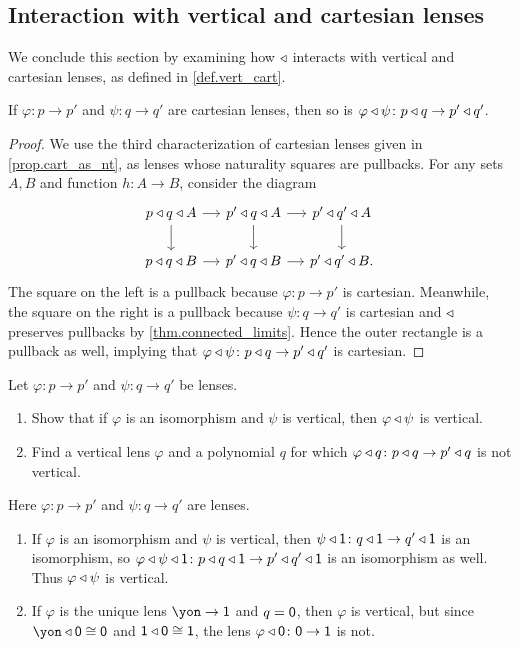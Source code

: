 \documentclass[Book-Poly]{subfiles}
\begin{document}
\subsection{Interaction with vertical and cartesian lenses} \label{subsec.comon.comp.prop.cart}

We conclude this section by examining how $\mathbin{\triangleleft}$ interacts with vertical and cartesian lenses, as defined in \cref{def.vert_cart}.

\begin{proposition}\label{prop.comp_pres_cart}
If $\varphi\colon p\to p'$ and $\psi\colon q\to q'$ are cartesian lenses, then so is $\varphi\mathbin{\triangleleft} \psi\colon p\mathbin{\triangleleft} q \to p'\mathbin{\triangleleft} q'$.
\end{proposition}
\begin{proof}
We use the third characterization of cartesian lenses given in \cref{prop.cart_as_nt}, as lenses whose naturality squares are pullbacks.
For any sets $A,B$ and function $h\colon A\to B$, consider the diagram
\[
\begin{tikzcd}[column sep=small]
    p\tri q\tri A\ar[r]\ar[d] & p'\tri q\tri A\ar[r]\ar[d] & p'\tri q'\tri A\ar[d] \\
    p\tri q\tri B\ar[r] & p'\tri q\tri B\ar[r] & p'\tri q'\tri B.
\end{tikzcd}
\]
The square on the left is a pullback because $\varphi\colon p\to p'$ is cartesian.
Meanwhile, the square on the right is a pullback because $\psi\colon q\to q'$ is cartesian and $\mathbin{\triangleleft}$ preserves pullbacks by \cref{thm.connected_limits}.
Hence the outer rectangle is a pullback as well, implying that $\varphi\mathbin{\triangleleft} \psi\colon p\mathbin{\triangleleft} q \to p'\mathbin{\triangleleft} q'$ is cartesian.
\end{proof}

\begin{exercise}
Let $\varphi\colon p\to p'$ and $\psi\colon q\to q'$ be lenses.
\begin{enumerate}
	\item Show that if $\varphi$ is an isomorphism and $\psi$ is vertical, then $\varphi\mathbin{\triangleleft} \psi$ is vertical.
	\item Find a vertical lens $\varphi$ and a polynomial $q$ for which $\varphi\mathbin{\triangleleft} q\colon p\mathbin{\triangleleft} q\to p'\mathbin{\triangleleft} q$ is not vertical.
\qedhere
\end{enumerate}
\begin{solution}
Here $\varphi\colon p\to p'$ and $\psi\colon q\to q'$ are lenses.
\begin{enumerate}
    \item If $\varphi$ is an isomorphism and $\psi$ is vertical, then $\psi\mathbin{\triangleleft}\textsf{1}\colon q\mathbin{\triangleleft}\textsf{1}\to q'\mathbin{\triangleleft}\textsf{1}$ is an isomorphism, so $\varphi\mathbin{\triangleleft} \psi\mathbin{\triangleleft}\textsf{1}\colon p\mathbin{\triangleleft} q\mathbin{\triangleleft}\textsf{1}\to p'\mathbin{\triangleleft} q'\mathbin{\triangleleft}\textsf{1}$ is an isomorphism as well.
    Thus $\varphi\mathbin{\triangleleft} \psi$ is vertical.
    \item If $\varphi$ is the unique lens $\yon\to\1$ and $q=\textsf{0}$, then $\varphi$ is vertical, but since $\yon\tri\0\iso\0$ and $\textsf{1}\mathbin{\triangleleft}\textsf{0}\cong\textsf{1}$, the lens $\varphi\mathbin{\triangleleft}\textsf{0}\colon\textsf{0}\to\textsf{1}$ is not.
\end{enumerate}
\end{solution}
\end{exercise}
\end{document}
